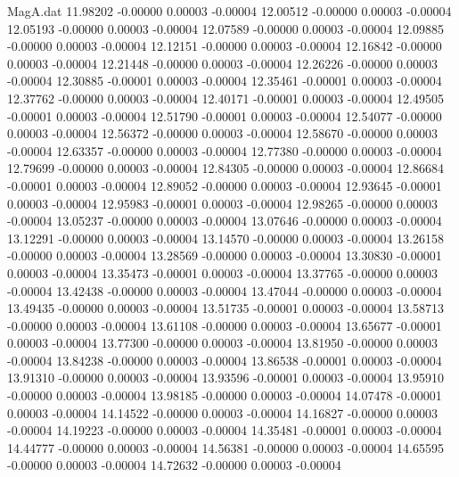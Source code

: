 \begin{filecontents}{MagA.dat}
  11.98202   -0.00000    0.00003   -0.00004
  12.00512   -0.00000    0.00003   -0.00004
  12.05193   -0.00000    0.00003   -0.00004
  12.07589   -0.00000    0.00003   -0.00004
  12.09885   -0.00000    0.00003   -0.00004
  12.12151   -0.00000    0.00003   -0.00004
  12.16842   -0.00000    0.00003   -0.00004
  12.21448   -0.00000    0.00003   -0.00004
  12.26226   -0.00000    0.00003   -0.00004
  12.30885   -0.00001    0.00003   -0.00004
  12.35461   -0.00001    0.00003   -0.00004
  12.37762   -0.00000    0.00003   -0.00004
  12.40171   -0.00001    0.00003   -0.00004
  12.49505   -0.00001    0.00003   -0.00004
  12.51790   -0.00001    0.00003   -0.00004
  12.54077   -0.00000    0.00003   -0.00004
  12.56372   -0.00000    0.00003   -0.00004
  12.58670   -0.00000    0.00003   -0.00004
  12.63357   -0.00000    0.00003   -0.00004
  12.77380   -0.00000    0.00003   -0.00004
  12.79699   -0.00000    0.00003   -0.00004
  12.84305   -0.00000    0.00003   -0.00004
  12.86684   -0.00001    0.00003   -0.00004
  12.89052   -0.00000    0.00003   -0.00004
  12.93645   -0.00001    0.00003   -0.00004
  12.95983   -0.00001    0.00003   -0.00004
  12.98265   -0.00000    0.00003   -0.00004
  13.05237   -0.00000    0.00003   -0.00004
  13.07646   -0.00000    0.00003   -0.00004
  13.12291   -0.00000    0.00003   -0.00004
  13.14570   -0.00000    0.00003   -0.00004
  13.26158   -0.00000    0.00003   -0.00004
  13.28569   -0.00000    0.00003   -0.00004
  13.30830   -0.00001    0.00003   -0.00004
  13.35473   -0.00001    0.00003   -0.00004
  13.37765   -0.00000    0.00003   -0.00004
  13.42438   -0.00000    0.00003   -0.00004
  13.47044   -0.00000    0.00003   -0.00004
  13.49435   -0.00000    0.00003   -0.00004
  13.51735   -0.00001    0.00003   -0.00004
  13.58713   -0.00000    0.00003   -0.00004
  13.61108   -0.00000    0.00003   -0.00004
  13.65677   -0.00001    0.00003   -0.00004
  13.77300   -0.00000    0.00003   -0.00004
  13.81950   -0.00000    0.00003   -0.00004
  13.84238   -0.00000    0.00003   -0.00004
  13.86538   -0.00001    0.00003   -0.00004
  13.91310   -0.00000    0.00003   -0.00004
  13.93596   -0.00001    0.00003   -0.00004
  13.95910   -0.00000    0.00003   -0.00004
  13.98185   -0.00000    0.00003   -0.00004
  14.07478   -0.00001    0.00003   -0.00004
  14.14522   -0.00000    0.00003   -0.00004
  14.16827   -0.00000    0.00003   -0.00004
  14.19223   -0.00000    0.00003   -0.00004
  14.35481   -0.00001    0.00003   -0.00004
  14.44777   -0.00000    0.00003   -0.00004
  14.56381   -0.00000    0.00003   -0.00004
  14.65595   -0.00000    0.00003   -0.00004
  14.72632   -0.00000    0.00003   -0.00004

\end{filecontents}
